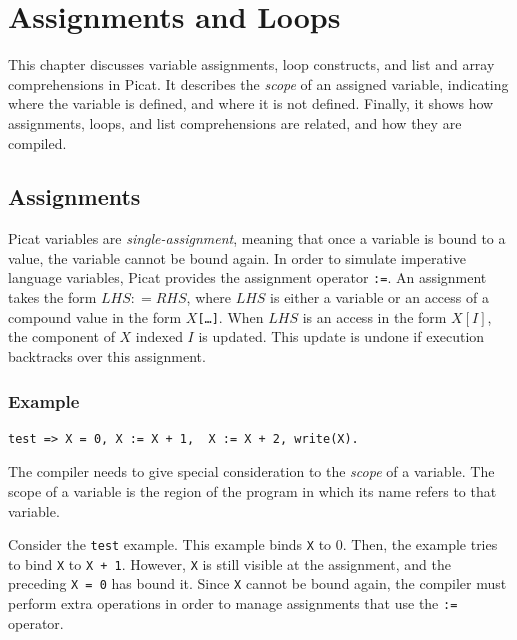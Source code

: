 \chapter{Assignments and Loops\label{chapter:loops}}
This chapter discusses variable assignments, loop constructs, and list and array comprehensions in Picat.  It describes the \emph{scope} of an assigned variable, indicating where the variable is defined, and where it is not defined.  Finally, it shows how assignments, loops, and list comprehensions are related, and how they are compiled.  

\section{Assignments}
Picat variables are \emph{single-assignment}, meaning that once a variable is bound to a value, the variable cannot be bound again.  In order to simulate imperative language variables, Picat provides the assignment operator \verb+:=+.  An assignment takes the form $LHS $$:$$=$$ RHS$, where $LHS$ is either a variable or an access of a compound value in the form \texttt{$X$[\ldots]}. When $LHS$ is an access in the form $X[I]$, the component of $X$ indexed $I$ is updated.  This update is undone if execution backtracks over this assignment.

\subsection*{Example}
\begin{verbatim}
test => X = 0, X := X + 1,  X := X + 2, write(X).
\end{verbatim}

The compiler needs to give special consideration to the \emph{scope} of a variable. The scope of a variable is the region of the program in which its name refers to that variable.

Consider the \texttt{test} example.  This example binds \texttt{X} to $0$.  Then, the example tries to bind \texttt{X} to \texttt{X + 1}.  However, \texttt{X} is still visible at the assignment, and the preceding \texttt{X = 0} has bound it.  Since \texttt{X} cannot be bound again, the compiler must perform extra operations in order to manage assignments that use the \texttt{:=} operator. 

